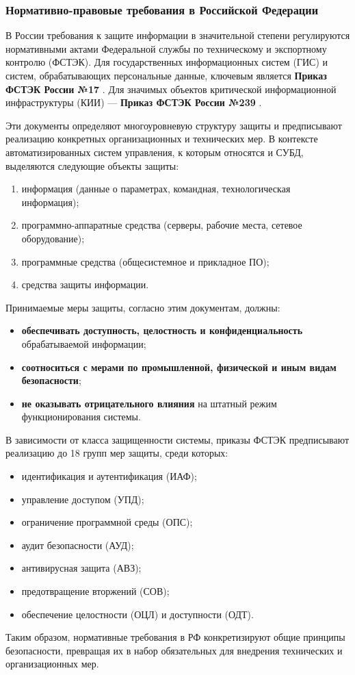 \subsubsection{Нормативно-правовые требования в Российской Федерации}
В России требования к защите информации в значительной степени регулируются нормативными актами Федеральной службы по техническому и экспортному контролю (ФСТЭК). Для государственных информационных систем (ГИС) и систем, обрабатывающих персональные данные, ключевым является \textbf{Приказ ФСТЭК России №17} \autocite{fstec17}. Для значимых объектов критической информационной инфраструктуры (КИИ) — \textbf{Приказ ФСТЭК России №239} \autocite{FSTEKOBKIS}.

Эти документы определяют многоуровневую структуру защиты и предписывают реализацию конкретных организационных и технических мер. В контексте автоматизированных систем управления, к которым относятся и СУБД, выделяются следующие объекты защиты:
\begin{enumerate}
	\item информация (данные о параметрах, командная, технологическая информация);
	\item программно-аппаратные средства (серверы, рабочие места, сетевое оборудование);
	\item программные средства (общесистемное и прикладное ПО);
	\item средства защиты информации.
\end{enumerate}

Принимаемые меры защиты, согласно этим документам, должны:
\begin{itemize}
    \item \textbf{обеспечивать доступность, целостность и конфиденциальность} обрабатываемой информации;
    \item \textbf{соотноситься с мерами по промышленной, физической и иным видам безопасности};
    \item \textbf{не оказывать отрицательного влияния} на штатный режим функционирования системы.
\end{itemize}

В зависимости от класса защищенности системы, приказы ФСТЭК предписывают реализацию до 18 групп мер защиты, среди которых:
\begin{itemize}
    \item идентификация и аутентификация (ИАФ);
    \item управление доступом (УПД);
    \item ограничение программной среды (ОПС);
    \item аудит безопасности (АУД);
    \item антивирусная защита (АВЗ);
    \item предотвращение вторжений (СОВ);
    \item обеспечение целостности (ОЦЛ) и доступности (ОДТ).
\end{itemize}
Таким образом, нормативные требования в РФ конкретизируют общие принципы безопасности, превращая их в набор обязательных для внедрения технических и организационных мер.

